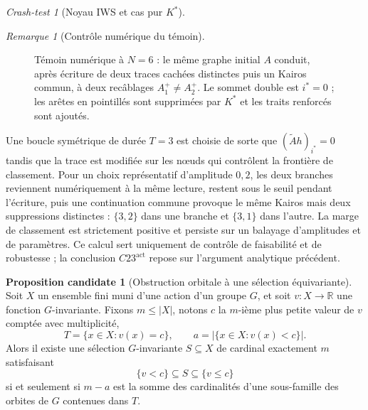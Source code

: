 \documentclass[11pt,a4paper]{article}
\theoremstyle{definition}
\newtheorem{proposition}[definition]{Proposition candidate}
\theoremstyle{remark}
\newtheorem{remark}[definition]{Remarque}
\newtheorem{crashtest}[definition]{Crash-test}
\begin{document}
\begin{crashtest}[Noyau IWS et cas pur $K^*$]
\begin{remark}[Contrôle numérique du témoin]
\begin{figure}[ht]
\caption{Témoin numérique à $N=6$ : le même graphe initial $A$ conduit, après écriture de deux traces cachées distinctes puis un Kairos commun, à deux recâblages $A_1^+\neq A_2^+$. Le sommet double est $i^*=0$ ; les arêtes en pointillés sont supprimées par $K^*$ et les traits renforcés sont ajoutés.}
\label{fig:temoin-n6-recablage}
\end{figure}

Une boucle symétrique de durée $T=3$ est choisie de sorte que $(\widetilde Ah)_{i^*}=0$ tandis que la trace est modifiée sur les nœuds qui contrôlent la frontière de classement. Pour un choix représentatif d'amplitude $0{,}2$, les deux branches reviennent numériquement à la même lecture, restent sous le seuil pendant l'écriture, puis une continuation commune provoque le même Kairos mais deux suppressions distinctes : $\{3,2\}$ dans une branche et $\{3,1\}$ dans l'autre. La marge de classement est strictement positive et persiste sur un balayage d'amplitudes et de paramètres. Ce calcul sert uniquement de contrôle de faisabilité et de robustesse ; la conclusion $C23^{\mathrm{act}}$ repose sur l'argument analytique précédent.
\end{remark}

\begin{proposition}[Obstruction orbitale à une sélection équivariante]
Soit $X$ un ensemble fini muni d'une action d'un groupe $G$, et soit $v:X\to\mathbb R$ une fonction $G$-invariante. Fixons $m\leq |X|$, notons $c$ la $m$-ième plus petite valeur de $v$ comptée avec multiplicité,
\[
T=\{x\in X:v(x)=c\},
\qquad
a=|\{x\in X:v(x)<c\}|.
\]
Alors il existe une sélection $G$-invariante $S\subseteq X$ de cardinal exactement $m$ satisfaisant
\[
\{v<c\}\subseteq S\subseteq\{v\leq c\}
\]
si et seulement si $m-a$ est la somme des cardinalités d'une sous-famille des orbites de $G$ contenues dans $T$.
\end{proposition}


\end{crashtest}
\end{document}
